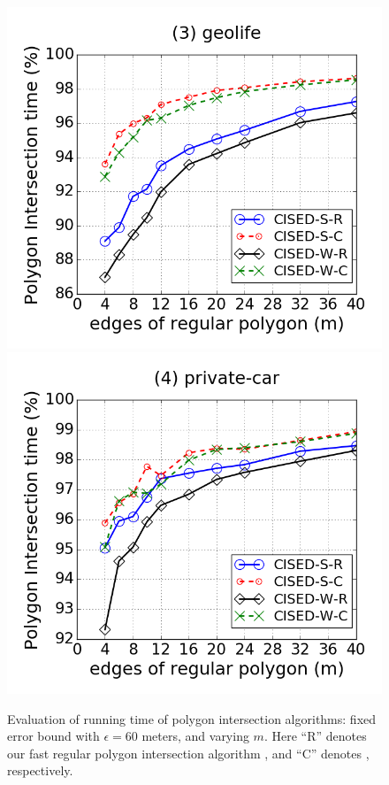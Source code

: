 \begin{figure}[tb!]
\includegraphics[scale = 0.240]{figures/Exp-M-poly-time-ratio-geolife.png}
\includegraphics[scale = 0.240]{figures/Exp-M-poly-time-ratio-private.png}
\vspace{-1ex}
\caption{\small Evaluation of running time of polygon intersection algorithms: fixed error bound with $\epsilon=60$ meters, and varying $m$. Here ``R'' denotes our fast regular polygon intersection algorithm \rpia, and ``C'' denotes \cpia, respectively.}
\label{fig:m-poly-time}
\vspace{-1ex}
\end{figure}


